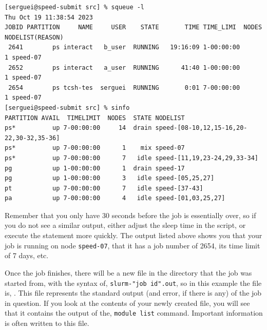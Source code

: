 \small
\begin{verbatim}
[serguei@speed-submit src] % squeue -l
Thu Oct 19 11:38:54 2023
JOBID PARTITION     NAME     USER    STATE       TIME TIME_LIMI  NODES NODELIST(REASON)
 2641        ps interact   b_user  RUNNING   19:16:09 1-00:00:00      1 speed-07
 2652        ps interact   a_user  RUNNING      41:40 1-00:00:00      1 speed-07
 2654        ps tcsh-tes  serguei  RUNNING       0:01 7-00:00:00      1 speed-07
[serguei@speed-submit src] % sinfo
PARTITION AVAIL  TIMELIMIT  NODES  STATE NODELIST
ps*          up 7-00:00:00     14  drain speed-[08-10,12,15-16,20-22,30-32,35-36]
ps*          up 7-00:00:00      1    mix speed-07
ps*          up 7-00:00:00      7   idle speed-[11,19,23-24,29,33-34]
pg           up 1-00:00:00      1  drain speed-17
pg           up 1-00:00:00      3   idle speed-[05,25,27]
pt           up 7-00:00:00      7   idle speed-[37-43]
pa           up 7-00:00:00      4   idle speed-[01,03,25,27]
\end{verbatim}
\normalsize

Remember that you only have 30 seconds before the job is essentially over, so 
if you do not see a similar output, either adjust the sleep time in the 
script, or execute the  statement more quickly. The  
output listed above shows you that your job is running on node \texttt{speed-07}, 
that it has a job number of 2654, its time limit of 7 days, etc.

Once the job finishes, there will be a new file in the directory that the job 
was started from, with the syntax of, \texttt{slurm-"job id".out}, so 
in this example the file is, . This file represents the 
standard output (and error, if there is any) of the job in question. If you 
look at the contents of your newly created file, you will see that it 
contains the output of the, \texttt{module list} command. 
Important information is often written to this file.
%
